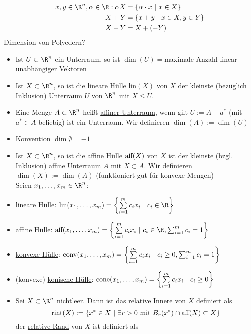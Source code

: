 \begin{align*}
	x,y \in \R^n, \alpha \in \R: \alpha X &= \left\{ \alpha \cdot x \ |\ x \in X \right\}\\
										  X + Y &=\left\{ x + y  \ |\ x \in X, y \in Y \right\}\\
										  X - Y &= X + (-Y)
\end{align*}
Dimension von Polyedern?
\begin{itemize}
	\item Ist $U \subset  \R^n$ ein Unterraum, so ist $\dim(U)=$maximale Anzahl linear unabhängiger Vektoren
	\item Ist $X \subset \R^n$, so ist die \underline{lineare Hülle} lin$(X)$ von $X$ der kleinste (bezüglich Inklusion) Unterraum $U$ von $\R^n$ mit $X \leq U$.
	\item Eine Menge $A \subset  \R^n$ heißt \underline{affiner Unterraum}, wenn gilt $U:=A-a^*$ (mit $a^* \in A$ beliebig) ist ein Unterraum.
		Wir definieren $\dim(A) := \dim(U)$
	\item Konvention $\dim\emptyset=-1$
	\item Ist $X\subset \R^n$, so ist die \underline{affine Hülle} $\text{aff}(X)$ von $X$ ist der kleinste (bzgl. Inklusion) affine Unterraum $A$ mit $X\subset A$.
		Wir definieren $\dim(X):=\dim(A)$ (funktioniert gut für konvexe Mengen)\\
		Seien $x_{1},\dots ,x_{m}\in\R^n$:
	\item \underline{lineare Hülle}: $\lin(x_{1},\dots ,x_{m})= \left\{ \sum\limits_{i=1}^{m} c_{i}x_{i}\ | \ c_{i}\in \R \right\}$
	\item \underline{affine Hülle}: $\aff(x_{1},\dots ,x_{m})= \left\{ \sum\limits_{i=1}^{m} c_{i}x_{i}\ | \ c_{i}\in \R, \sum_{i=1}^{m} c_{i}= 1 \right\}$
	\item \underline{konvexe Hülle}: $\text{conv}(x_{1},\dots ,x_{m})= \left\{ \sum\limits_{i=1}^{m} c_{i}x_{i}\ | \ c_{i}\geq 0, \sum_{i=1}^{m} c_{i}= 1 \right\}$
	\item (konvexe) \underline{konische Hülle}: $\text{cone}(x_{1},\dots ,x_{m})= \left\{ \sum\limits_{i=1}^{m} c_{i}x_{i}\ | \ c_{i}\geq 0 \right\}$
	\item Sei $X \subset \R^n$ nichtleer. Dann ist das \underline{relative Innere} von $X$ definiert als
		\begin{equation*}
			\text{rint}(X):= \left\{ x^* \in X \ |\ \exists r >0 \text{ mit } B_{r}(x^*)\cap\text{aff}(X) \subset X \right\}
		\end{equation*}
		der \underline{relative Rand} von $X$ ist definiert als

\end{itemize}
